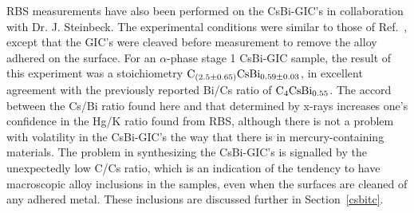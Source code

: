         RBS measurements  have also   been performed on  the CsBi-GIC's  in
collaboration with Dr. J. Steinbeck.\cite{E291} The experimental conditions
were similar to  those  of  Ref.~\cite{S175}, except that  the  GIC's  were
cleaved before measurement to remove the alloy adhered on the surface.  For
an $\alpha$-phase  stage 1 CsBi-GIC  sample, the result of this  experiment
was  a  stoichiometry $\rm  C_{(2.5  \pm  0.65)}CsBi_{0.59   \pm 0.03}$, in
ex\-cell\-ent  agree\-ment with  the  pre\-vi\-ously  re\-ported Bi/Cs ra\-tio  of   $\rm
C_4CsBi_{0.55}$.\cite{lagrange87,yang87} The accord between the Cs/Bi ratio
found here and that  determined by x-rays\cite{lagrange87,yang87} increases
one's confidence in the Hg/K ratio found from RBS, although  there is not a
problem with volatility  in   the   CsBi-GIC's  the  way that  there  is in
mercury-containing materials.  The problem in  synthesizing the  CsBi-GIC's
is signalled by the unexpectedly low C/Cs ratio, which is  an indication of
the tendency  to have macroscopic alloy inclusions  in the samples, even when
the  surfaces  are  cleaned of any  adhered  metal.   These  inclusions are
discussed further in Section~\ref{csbitc}.

